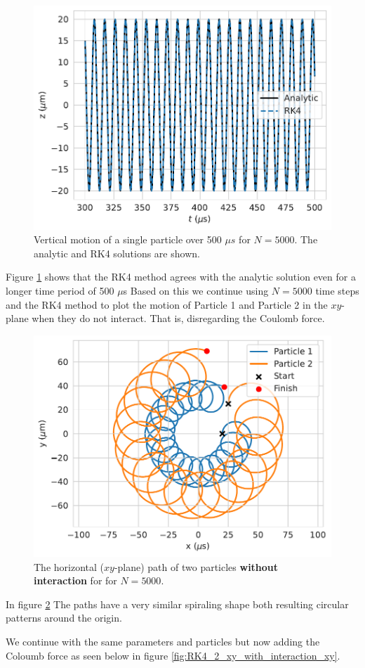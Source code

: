 \documentclass[english,notitlepage,reprint,nofootinbib]{revtex4-1}  %
\begin{document}
\begin{figure}[H]
    \centering
    \includegraphics[width=.5\textwidth]{../figures/analytic_RK4_t_axis_2_N5000.pdf}
    \caption{Vertical motion of a single particle over 500 $\mu s$ for $N=5000$. The analytic and RK4 solutions are shown.}
    \label{fig:analytic_RK4_t_axis_2_N5000}
\end{figure}

Figure \ref{fig:analytic_RK4_t_axis_2_N5000} shows that the RK4 method agrees with the analytic solution even for a longer time period of 500 $\mu$s
Based on this we continue using $N=5000$ time steps and the RK4 method to plot the motion of Particle 1 and Particle 2 in the $xy$-plane when they do not interact.
That is, disregarding the Coulomb force.
\begin{figure}[H]
    \centering
    \includegraphics[width=.5\textwidth]{../figures/2p_N5000_RK4_xy.pdf}
    \caption{The horizontal ($xy$-plane) path of two particles \textbf{without interaction} for for $N = 5000$.}
    \label{fig:RK4_2_xy_no_interaction_xy}
\end{figure}
In figure \ref{fig:RK4_2_xy_no_interaction_xy}
The paths have a very similar spiraling shape both resulting circular patterns around the origin.

We continue with the same parameters and particles but now adding the Coloumb force as seen below in figure \ref{fig:RK4_2_xy_with_interaction_xy}.
\end{document}
